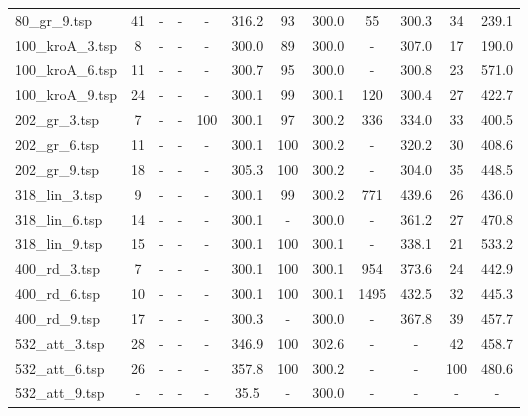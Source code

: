 \begin{table}[H]
\begin{tabular}{|l|c||cc|cc|cc|cc|cc|}
80\_gr\_9.tsp & 41 & - & - & - & 316.2 & 93 & 300.0 & 55 & 300.3 & 34 & 239.1 \\
100\_kroA\_3.tsp & 8 & - & - & - & 300.0 & 89 & 300.0 & - & 307.0 & 17 & 190.0 \\
100\_kroA\_6.tsp & 11 & - & - & - & 300.7 & 95 & 300.0 & - & 300.8 & 23 & 571.0 \\
100\_kroA\_9.tsp & 24 & - & - & - & 300.1 & 99 & 300.1 & 120 & 300.4 & 27 & 422.7 \\
202\_gr\_3.tsp & 7 & - & - & 100 & 300.1 & 97 & 300.2 & 336 & 334.0 & 33 & 400.5 \\
202\_gr\_6.tsp & 11 & - & - & - & 300.1 & 100 & 300.2 & - & 320.2 & 30 & 408.6 \\
202\_gr\_9.tsp & 18 & - & - & - & 305.3 & 100 & 300.2 & - & 304.0 & 35 & 448.5 \\
318\_lin\_3.tsp & 9 & - & - & - & 300.1 & 99 & 300.2 & 771 & 439.6 & 26 & 436.0 \\
318\_lin\_6.tsp & 14 & - & - & - & 300.1 & - & 300.0 & - & 361.2 & 27 & 470.8 \\
318\_lin\_9.tsp & 15 & - & - & - & 300.1 & 100 & 300.1 & - & 338.1 & 21 & 533.2 \\
400\_rd\_3.tsp & 7 & - & - & - & 300.1 & 100 & 300.1 & 954 & 373.6 & 24 & 442.9 \\
400\_rd\_6.tsp & 10 & - & - & - & 300.1 & 100 & 300.1 & 1495 & 432.5 & 32 & 445.3 \\
400\_rd\_9.tsp & 17 & - & - & - & 300.3 & - & 300.0 & - & 367.8 & 39 & 457.7 \\
532\_att\_3.tsp & 28 & - & - & - & 346.9 & 100 & 302.6 & - & - & 42 & 458.7 \\
532\_att\_6.tsp & 26 & - & - & - & 357.8 & 100 & 300.2 & - & - & 100 & 480.6 \\
532\_att\_9.tsp & - & - & - & - & 35.5 & - & 300.0 & - & - & - & - \\
\hline
\end{tabular}
\end{table}
